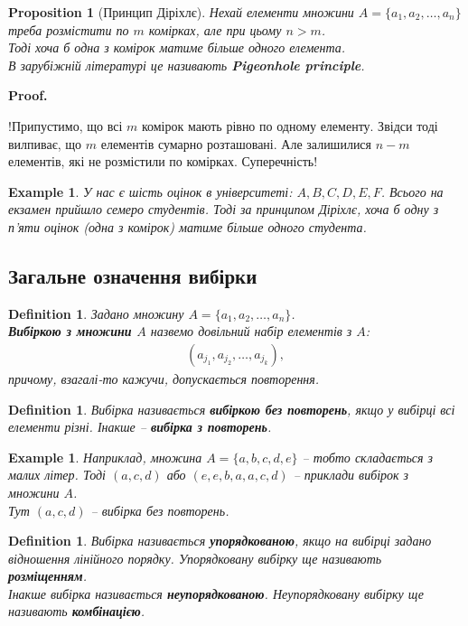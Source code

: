 \documentclass[a4paper, 14pt]{extarticle}
\makeatletter
\theoremstyle{theoremdd}
\theoremstyle{theoremdd}
\newtheorem{definition}[theorem]{Definition}
\theoremstyle{theoremdd}
\theoremstyle{theoremdd}
\theoremstyle{theoremdd}
\newtheorem{example}[theorem]{Example}
\theoremstyle{theoremdd}
\theoremstyle{theoremdd}
\theoremstyle{theoremdd}
\theoremstyle{theoremdd}
\newtheorem{proposition}[theorem]{Proposition}
\theoremstyle{theoremdd}
\theoremstyle{theoremdd}
\theoremstyle{theoremdd}
\theoremstyle{theoremdd}
\theoremstyle{theoremdd}
\theoremstyle{theoremdd}
\renewenvironment{proof}[1][Proof.\\]{\par
\pushQED{\hfill \qed}%
\normalfont \topsep6\p@\@plus6\p@\relax
\trivlist
\item\relax
{\bfseries
#1\@addpunct{.}}\hspace\labelsep\ignorespaces
}{%
\popQED\endtrivlist\@endpefalse
}
\makeatother
\begin{document}
\begin{proposition}[Принцип Діріхлє]
Нехай елементи множини $A = \{a_1,a_2,\dots,a_n\}$ треба розмістити по $m$ комірках, але при цьому $n > m$.\\
Тоді хоча б одна з комірок матиме більше одного елемента.\\
В зарубіжній літературі це називають \textbf{Pigeonhole principle}.
\end{proposition}

\begin{proof}
!Припустимо, що всі $m$ комірок мають рівно по одному елементу. Звідси тоді вилпиває, що $m$ елементів сумарно розташовані. Але залишилися $n-m$ елементів, які не розмістили по комірках. Суперечність!
\end{proof}

\begin{example}
У нас є шість оцінок в університеті: $A,B,C,D,E,F$. Всього на екзамен прийшло семеро студентів. Тоді за принципом Діріхлє, хоча б одну з п'яти оцінок (одна з комірок) матиме більше одного студента.
\end{example}

\subsection{Загальне означення вибірки}
\begin{definition}
Задано множину $A = \{a_1,a_2,\dots,a_n\}$.\\
\textbf{Вибіркою з множини $A$} назвемо довільний набір елементів з $A$:
\begin{align*}
(a_{j_1},a_{j_2},\dots,a_{j_k}),
\end{align*}
причому, взагалі-то кажучи, допускається повторення.
\end{definition}

\begin{definition}
Вибірка називається \textbf{вибіркою без повторень}, якщо у вибірці всі елементи різні. Інакше -- \textbf{вибірка з повторень}.
\end{definition}

\begin{example}
Наприклад, множина $A = \{a,b,c,d,e\}$ -- тобто складається з малих літер. Тоді $(a,c,d)$ або $(e,e,b,a,a,c,d)$ -- приклади вибірок з множини $A$.\\
Тут $(a,c,d)$ -- вибірка без повторень.
\end{example}

\begin{definition}
Вибірка називається \textbf{упорядкованою}, якщо на вибірці задано відношення лінійного порядку. Упорядковану вибірку ще називають \textbf{розміщенням}.\\
Інакше вибірка називається \textbf{неупорядкованою}. Неупорядковану вибірку ще називають \textbf{комбінацією}.
\end{definition}
\end{document}
